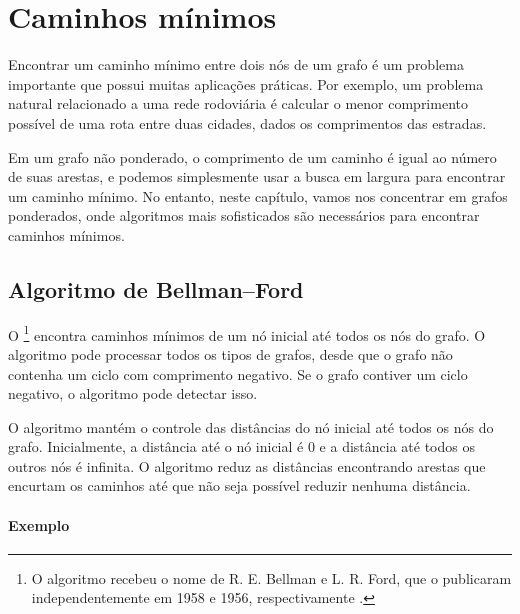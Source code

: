 \chapter{Caminhos mínimos}


Encontrar um caminho mínimo entre dois nós
de um grafo
é um problema importante que possui muitas
aplicações práticas.
Por exemplo, um problema natural relacionado a uma rede rodoviária
é calcular o menor comprimento possível de uma rota
entre duas cidades, dados os comprimentos das estradas.

Em um grafo não ponderado, o comprimento de um caminho é igual
ao número de suas arestas, e podemos
simplesmente usar a busca em largura para encontrar
um caminho mínimo.
No entanto, neste capítulo, vamos nos concentrar em
grafos ponderados,
onde algoritmos mais sofisticados
são necessários
para encontrar caminhos mínimos.

\section{Algoritmo de Bellman–Ford}


O \footnote{O algoritmo recebeu o nome de
R. E. Bellman e L. R. Ford, que o publicaram independentemente
em 1958 e 1956, respectivamente \cite{bel58,for56a}.} encontra
caminhos mínimos de um nó inicial até todos os
nós do grafo.
O algoritmo pode processar todos os tipos de grafos,
desde que o grafo não contenha um
ciclo com comprimento negativo.
Se o grafo contiver um ciclo negativo,
o algoritmo pode detectar isso.

O algoritmo mantém o controle das distâncias
do nó inicial até todos os nós do grafo.
Inicialmente, a distância até o nó inicial é 0
e a distância até todos os outros nós é infinita.
O algoritmo reduz as distâncias encontrando
arestas que encurtam os caminhos até que não seja
possível reduzir nenhuma distância.

\subsubsection{Exemplo}

